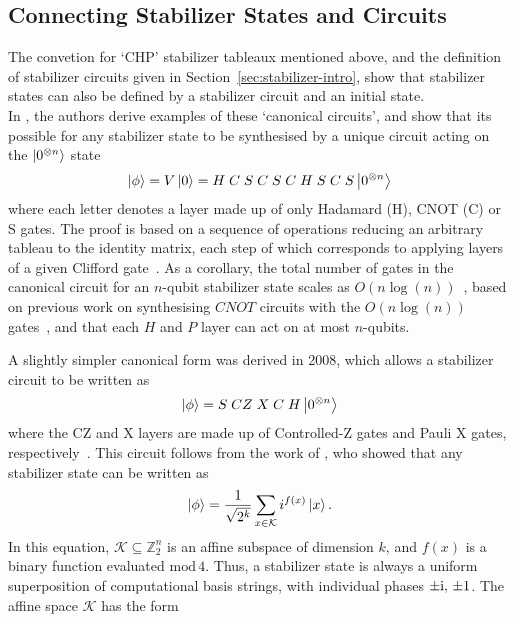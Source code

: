\subsection{Connecting Stabilizer States and Circuits}
The convetion for `CHP' stabilizer tableaux mentioned above, and the definition of stabilizer circuits given in Section~\ref{sec:stabilizer-intro}, show that stabilizer states can also be defined by a stabilizer circuit and an initial state.\\
In \cite{Aaronson2004}, the authors derive examples of these `canonical circuits', and show that its possible for any stabilizer state to be synthesised by a unique circuit acting on the $\ket{0^{\otimes n}}$ state
\begin{equation}
    \ket{\phi} = V\ket{0} = H\;C\;S\;C\;S\;C \;H \; S \;C \;S \ket{0^{\otimes n}}\label{eq:chpcirc}
\end{equation}
where each letter denotes a layer made up of only Hadamard (H), CNOT (C) or S gates. The proof is based on  a sequence of operations reducing an arbitrary tableau to the identity matrix, each step of which corresponds to applying layers of a given Clifford gate~\cite{Aaronson2004}. As a corollary, the total number of gates in the canonical circuit for an $n$-qubit stabilizer state scales as $O(n\log (n))$~\cite{Aaronson2004}, based on previous work on synthesising $CNOT$ circuits with the $O(n\log (n))$ gates~\cite{Patel2003}, and that each $H$ and $P$ layer can act on at most $n$-qubits.\par
A slightly simpler canonical form was derived in 2008, which allows a stabilizer circuit to be written as
\begin{equation}
    \ket{\phi} = S\;CZ\;X\;C\;H \ket{0^{\otimes n}} \label{eq:affinecirc}
\end{equation}
where the CZ and X layers are made up of Controlled-Z gates and Pauli X gates, respectively~\cite{VandenNest2008}. This circuit follows from the work of \cite{Dehaene2003}, who showed that any stabilizer state can be written as
\begin{equation}
    \ket{\phi} = \frac{1}{\sqrt{2^{k}}}\sum_{x\in\mathcal{K}} i^{f(x)}\ket{x}.\label{eq:affineform}
\end{equation}
In this equation, $\mathcal{K}\subseteq\mathbb{Z}_{2}^{n}$ is an affine subspace of dimension $k$, and $f(x)$ is a binary  function evaluated $\text{mod}\,4$. Thus, a stabilizer state is always a uniform superposition of computational basis strings, with individual phases $\pm \mathrm{i},\,\pm 1$. The affine space $\mathcal{K}$ has the form
